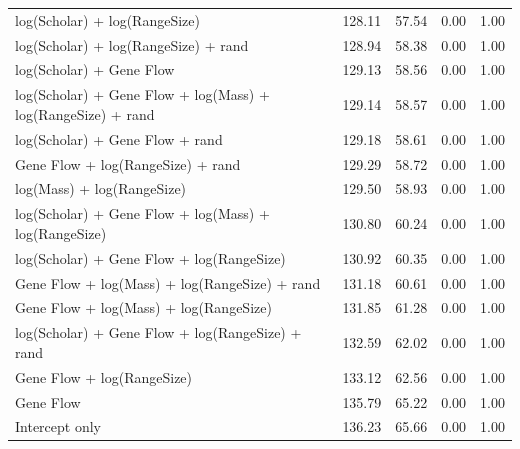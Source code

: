 \begin{table}[ht]
\begin{tabular}{@{}lrrrr@{}}
  log(Scholar) + log(RangeSize) & 128.11 & 57.54 & 0.00 & 1.00 \\ 
  log(Scholar) + log(RangeSize) + rand & 128.94 & 58.38 & 0.00 & 1.00 \\ 
  log(Scholar) + Gene Flow & 129.13 & 58.56 & 0.00 & 1.00 \\ 
  log(Scholar) + Gene Flow + log(Mass) + log(RangeSize) + rand & 129.14 & 58.57 & 0.00 & 1.00 \\ 
  log(Scholar) + Gene Flow + rand & 129.18 & 58.61 & 0.00 & 1.00 \\ 
  Gene Flow + log(RangeSize) + rand & 129.29 & 58.72 & 0.00 & 1.00 \\ 
  log(Mass) + log(RangeSize) & 129.50 & 58.93 & 0.00 & 1.00 \\ 
  log(Scholar) + Gene Flow + log(Mass) + log(RangeSize) & 130.80 & 60.24 & 0.00 & 1.00 \\ 
  log(Scholar) + Gene Flow + log(RangeSize) & 130.92 & 60.35 & 0.00 & 1.00 \\ 
  Gene Flow + log(Mass) + log(RangeSize) + rand & 131.18 & 60.61 & 0.00 & 1.00 \\ 
  Gene Flow + log(Mass) + log(RangeSize) & 131.85 & 61.28 & 0.00 & 1.00 \\ 
  log(Scholar) + Gene Flow + log(RangeSize) + rand & 132.59 & 62.02 & 0.00 & 1.00 \\ 
  Gene Flow + log(RangeSize) & 133.12 & 62.56 & 0.00 & 1.00 \\ 
  Gene Flow & 135.79 & 65.22 & 0.00 & 1.00 \\ 
  Intercept only & 136.23 & 65.66 & 0.00 & 1.00 \\ 
   \bottomrule
\end{tabular}
\endgroup
\end{table}

















